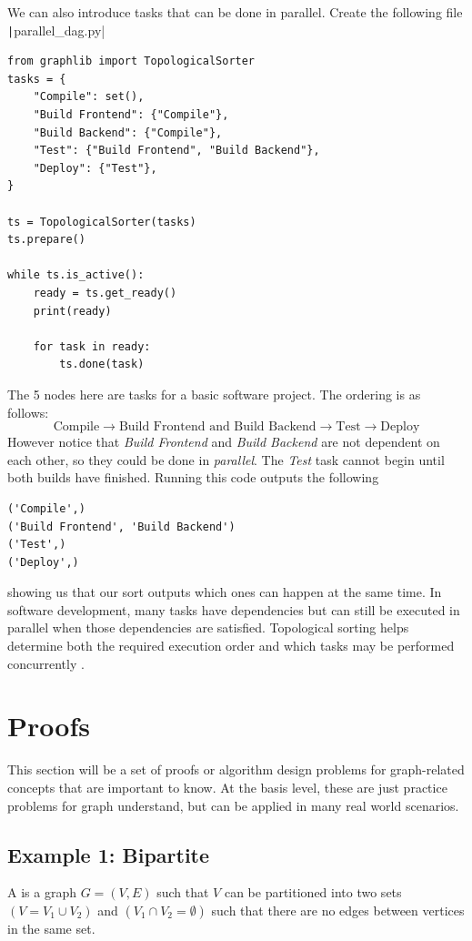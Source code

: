 We can also introduce tasks that can be done in parallel. Create the following file \texttt|parallel_dag.py|
\begin{verbatim}
from graphlib import TopologicalSorter
tasks = {
    "Compile": set(),
    "Build Frontend": {"Compile"},
    "Build Backend": {"Compile"},
    "Test": {"Build Frontend", "Build Backend"},
    "Deploy": {"Test"},
}

ts = TopologicalSorter(tasks)
ts.prepare()

while ts.is_active():
    ready = ts.get_ready()
    print(ready)

    for task in ready:
        ts.done(task)

\end{verbatim}

The 5 nodes here are tasks for a basic software project. The ordering is as follows:
$$\text{Compile} \rightarrow \text{Build Frontend and Build Backend} \rightarrow \text{Test} \rightarrow \text{Deploy}$$
However notice that \textit{Build Frontend} and \textit{Build Backend} are not dependent on each other, so they could be done in \emph{parallel}. The \textit{Test} task cannot begin until both builds have finished.
Running this code outputs the following
\begin{verbatim}
('Compile',)
('Build Frontend', 'Build Backend')
('Test',)
('Deploy',)
\end{verbatim}
showing us that our sort outputs which ones can happen at the same time. In software development, many tasks have dependencies but can still be executed in parallel when those dependencies are satisfied. Topological sorting helps determine both the required execution order and which tasks may be performed concurrently .
\section{Proofs}
This section will be a set of proofs or algorithm design problems for graph-related concepts that are important to know. At the basis level, these are just practice problems for graph understand, but can be applied in many real world scenarios.

\subsection{Example 1: Bipartite}

\begin{mdframed}[frametitle = {Bipartite Graph}, style = important]

A  is a graph $G = (V,E)$ such that $V$ can be partitioned into two sets $(V = V_1 \cup V_2)$ and $(V_1 \cap V_2 = \emptyset)$ such that there are no edges between vertices in the same set.
\end{mdframed}

